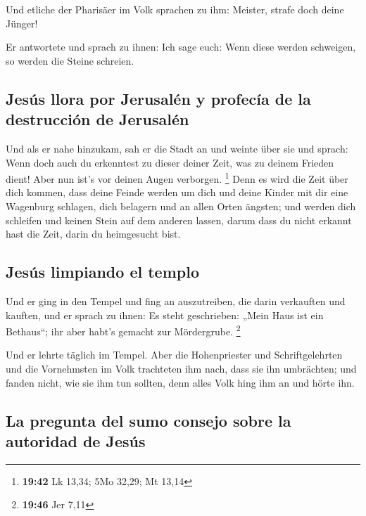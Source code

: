  Und etliche der Pharisäer im Volk sprachen zu ihm:
Meister, strafe doch deine Jünger!

 Er antwortete und sprach zu ihnen: Ich sage euch: Wenn
diese werden schweigen, so werden die Steine schreien.

\hypertarget{jesuxfas-llora-por-jerusaluxe9n-y-profecuxeda-de-la-destrucciuxf3n-de-jerusaluxe9n}{%
\subsection{Jesús llora por Jerusalén y profecía de la destrucción de
Jerusalén}\label{jesuxfas-llora-por-jerusaluxe9n-y-profecuxeda-de-la-destrucciuxf3n-de-jerusaluxe9n}}

 Und als er nahe hinzukam, sah er die Stadt an und weinte
über sie  und sprach: Wenn doch auch du erkenntest zu
dieser deiner Zeit, was zu deinem Frieden dient! Aber nun ist's vor
deinen Augen verborgen. \footnote{\textbf{19:42} Lk 13,34; 5Mo 32,29; Mt
  13,14}  Denn es wird die Zeit über dich kommen, dass
deine Feinde werden um dich und deine Kinder mit dir eine Wagenburg
schlagen, dich belagern und an allen Orten ängsten;  und
werden dich schleifen und keinen Stein auf dem anderen lassen, darum
dass du nicht erkannt hast die Zeit, darin du heimgesucht bist.

\hypertarget{jesuxfas-limpiando-el-templo}{%
\subsection{Jesús limpiando el
templo}\label{jesuxfas-limpiando-el-templo}}

 Und er ging in den Tempel und fing an auszutreiben, die
darin verkauften und kauften,  und er sprach zu ihnen: Es
steht geschrieben: „Mein Haus ist ein Bethaus``; ihr aber habt's gemacht
zur Mördergrube. \footnote{\textbf{19:46} Jer 7,11}

 Und er lehrte täglich im Tempel. Aber die Hohenpriester
und Schriftgelehrten und die Vornehmsten im Volk trachteten ihm nach,
dass sie ihn umbrächten;  und fanden nicht, wie sie ihm
tun sollten, denn alles Volk hing ihm an und hörte ihn.

\hypertarget{la-pregunta-del-sumo-consejo-sobre-la-autoridad-de-jesuxfas}{%
\subsection{La pregunta del sumo consejo sobre la autoridad de
Jesús}\label{la-pregunta-del-sumo-consejo-sobre-la-autoridad-de-jesuxfas}}

